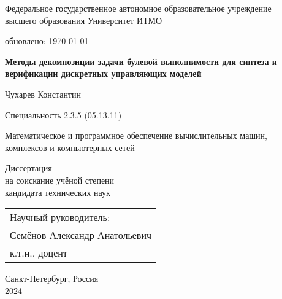 \thispagestyle{empty}

\begin{center}
    Федеральное государственное автономное образовательное учреждение \\
    высшего образования Университет ИТМО

    {\tiny обновлено: \today}
\end{center}

\vspace{0pt plus2fill}

\begin{center}

\textbf{\large
Методы декомпозиции задачи булевой выполнимости для синтеза и верификации дискретных управляющих моделей
}

\vspace{1cm}

{\large
    Чухарев Константин
}

\vspace{1cm}

Специальность 2.3.5 (05.13.11)
\begin{SingleSpace*}
    \small
    Математическое и программное обеспечение вычислительных машин, \\
    комплексов и компьютерных сетей
\end{SingleSpace*}

\vspace{1cm}

Диссертация \\
на соискание учёной степени \\
кандидата технических наук

\end{center}

\vspace{0pt plus1fill}

\hfill\begin{tabular}{l}
Научный руководитель: \\
Семёнов Александр Анатольевич \\
к.т.н., доцент
\end{tabular}

\vspace{0pt plus1fill}

\begin{center}
    Санкт-Петербург, Россия \\
    2024
\end{center}
